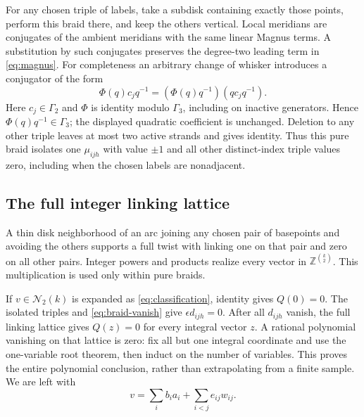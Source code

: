 \documentclass[11pt]{article}
\theoremstyle{remark}\newtheorem{remark}[theorem]{Remark}
\newcommand{\Z}{\mathbb Z}
\newcommand{\N}{\mathcal N}
\begin{document}
For any chosen triple of labels, take a subdisk containing exactly those
points, perform this braid there, and keep the others vertical. Local
meridians are conjugates of the ambient meridians with the same linear
Magnus terms. A substitution by such conjugates preserves the degree-two
leading term in \eqref{eq:magnus}. For completeness an arbitrary change of
whisker introduces a conjugator of the form
\[
\Phi(q)c_jq^{-1}=(\Phi(q)q^{-1})(qc_jq^{-1}).
\]
Here $c_j\in\Gamma_2$ and $\Phi$ is identity modulo $\Gamma_3$, including on
inactive generators. Hence $\Phi(q)q^{-1}\in\Gamma_3$; the displayed
quadratic coefficient is unchanged. Deletion to any other triple leaves
at most two active strands and gives identity. Thus this pure braid isolates
one $\mu_{ijh}$ with value $\pm1$ and all other distinct-index triple values
zero, including when the chosen labels are nonadjacent.

\subsection{The full integer linking lattice}
A thin disk neighborhood of an arc joining any chosen pair of basepoints
and avoiding the others supports a full twist with linking one on that
pair and zero on all other pairs. Integer powers and products realize
every vector in $\Z^{\binom{k}{2}}$. This multiplication is used only within
pure braids.

If $v\in\N_2(k)$ is expanded as \eqref{eq:classification}, identity gives
$Q(0)=0$. The isolated triples and \eqref{eq:braid-vanish} give
$\epsilon d_{ijh}=0$. After all $d_{ijh}$ vanish, the full linking lattice
gives $Q(z)=0$ for every integral vector $z$. A rational polynomial
vanishing on that lattice is zero: fix all but one integral coordinate
and use the one-variable root theorem, then induct on the number of
variables. This proves the entire polynomial conclusion, rather than
extrapolating from a finite sample. We are left with
\begin{equation}\label{eq:remaining}
v=\sum_i b_i a_i+\sum_{i<j}e_{ij}w_{ij}.
\end{equation}
\end{document}
